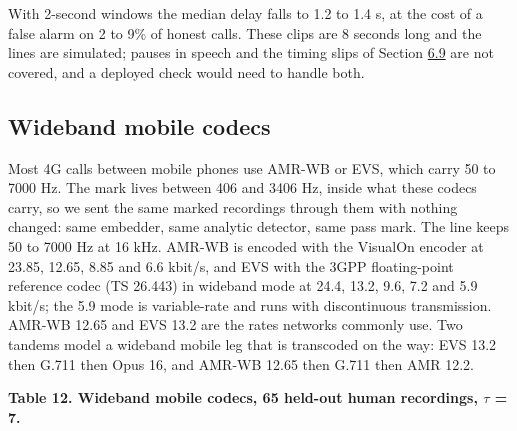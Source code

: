 \documentclass[10pt,a4paper]{article}
\begin{document}
With 2-second windows the median delay falls to 1.2 to 1.4 s, at the cost of a false alarm on 2 to 9\% of honest calls. These clips are 8 seconds long and the lines are simulated; pauses in speech and the timing slips of Section \hyperref[s-6-9]{6.9} are not covered, and a deployed check would need to handle both.

\subsection{Wideband mobile codecs}\label{s-6-12}

Most 4G calls between mobile phones use AMR-WB or EVS, which carry 50 to 7000 Hz. The mark lives between 406 and 3406 Hz, inside what these codecs carry, so we sent the same marked recordings through them with nothing changed: same embedder, same analytic detector, same pass mark. The line keeps 50 to 7000 Hz at 16 kHz. AMR-WB is encoded with the VisualOn encoder at 23.85, 12.65, 8.85 and 6.6 kbit/s, and EVS with the 3GPP floating-point reference codec (TS 26.443) in wideband mode at 24.4, 13.2, 9.6, 7.2 and 5.9 kbit/s; the 5.9 mode is variable-rate and runs with discontinuous transmission. AMR-WB 12.65 and EVS 13.2 are the rates networks commonly use. Two tandems model a wideband mobile leg that is transcoded on the way: EVS 13.2 then G.711 then Opus 16, and AMR-WB 12.65 then G.711 then AMR 12.2.

\begin{center}\small {}\label{t-12}\textbf{Table 12. Wideband mobile codecs, 65 held-out human recordings, $\tau$ = 7.}\end{center}
\end{document}
